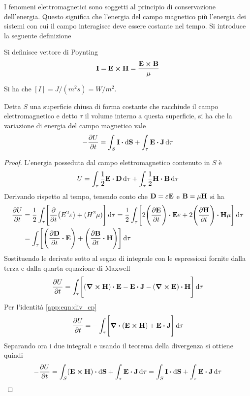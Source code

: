 I fenomeni elettromagnetici sono soggetti al principio di conservazione dell'energia. Questo
significa che l'energia del campo magnetico più l'energia dei sistemi con cui il campo
interagisce deve essere costante nel tempo.
Si introduce la seguente definizione
\begin{defn}
    Si definisce vettore di Poynting
    \begin{equation}
        \label{eqn:poynting}
        \vb{I}=\vb{E}\cp\vb{H}=\frac{\vb{E}\cp\vb{B}}{\mu}
    \end{equation}
\end{defn}
Si ha che $[I]=J/(m^2s)=W/m^2 $.
\begin{thm}
    Detta $S$ una superficie chiusa di forma costante che racchiude il campo elettromagnetico e detto $\tau$ il volume interno a questa
    superficie, si ha che la variazione di energia del campo magnetico vale
    \begin{equation}
        \label{eqn:dU_em}
        -\pdv{U}{t}=\int_S \vb{I}\vdot\dd{\vb{S}}+\int_{\tau} \vb{E}\vdot\vb{J}\dd{\tau}
    \end{equation}
\end{thm}
\begin{proof}
    L'energia posseduta dal campo elettromagnetico contenuto in $S$ è
    \[
        U=\int_{\tau}\rec{2}\vb{E}\vdot\vb{D}\dd{\tau}+\int_{\tau}\rec{2}\vb{H}\vdot\vb{B}\dd{\tau}
    \]
    Derivando rispetto al tempo, tenendo conto che $\vb{D}=\varepsilon \vb{E}$ e $\vb{B}=\mu\vb{H}$ si ha
    \[
        \begin{split}
            \pdv{U}{t}&=\rec{2}\int_{\tau}\Biggl[\pdv{t} (E^2\epsilon  ) + (H^2\mu  ) \Biggr] \dd{\tau}
            =\rec{2}\int_{\tau}\Biggl[2\Biggl( \pdv{\vb{E}}{t} \Biggr)\vdot \vb{E}\epsilon  +
            2\Biggl(\pdv{\vb{H}}{t} \Biggr)\vdot \vb{H}\mu \Biggr]\dd{\tau} \\
            &=\int_{\tau}\Biggl[\Biggl( \pdv{\vb{D}}{t} \vdot \vb{E} \Biggr) +
            \Biggl( \pdv{\vb{B}}{t} \vdot \vb{H} \Biggr)\Biggr] \dd{\tau}
        \end{split}
    \]
    Sostituendo le derivate sotto al segno di integrale con le espressioni fornite dalla terza e dalla quarta equazione di Maxwell
    \[
        \pdv{U}{t}=\int_{\tau}\Biggl[ (\curl{\vb{H}}) \vdot \vb{E} -\vb{E}\vdot\vb{J} - (\curl{\vb{E}}) \vdot \vb{H} \Biggr]\dd{\tau}
    \]
    Per l'identità \eqref{app:eqn:div_cp}
    \[
        \pdv{U}{t}=-\int_{\tau}\Biggl[ \div(\vb{E} \cp \vb{H}) + \vb{E}\vdot\vb{J} \Biggr]\dd{\tau}
    \]
    Separando ora i due integrali e usando il teorema della divergenza si ottiene quindi
    \[
        -\pdv{U}{t}=\int_{S} (\vb{E} \cp \vb{H})\vdot\dd{\vb{S}} + \int_{\tau} \vb{E}\vdot\vb{J} \dd{\tau}=
        \int_{S} \vb{I} \vdot\dd{\vb{S}}+ \int_{\tau} \vb{E}\vdot\vb{J} \dd{\tau}
    \]
\end{proof}

